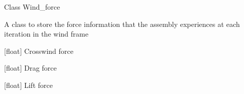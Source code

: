 \documentclass[letterpaper,10pt,english]{sphinxmanual}
\begin{document}
\begin{fulllineitems}
\label{\detokenize{modules:assembly.Wind_force}}
\pysigstartsignatures
{}
\pysigstopsignatures
\sphinxAtStartPar
Class Wind\_force

\sphinxAtStartPar
A class to store the force information that the assembly experiences at each iteration in the wind frame

\begin{fulllineitems}
\label{\detokenize{modules:assembly.Wind_force.crosswind}}
\pysigstartsignatures
{}
\pysigstopsignatures
\sphinxAtStartPar
{[}float{]} Crosswind force

\end{fulllineitems}


\begin{fulllineitems}
\label{\detokenize{modules:assembly.Wind_force.drag}}
\pysigstartsignatures
{}
\pysigstopsignatures
\sphinxAtStartPar
{[}float{]} Drag force

\end{fulllineitems}


\begin{fulllineitems}
\label{\detokenize{modules:assembly.Wind_force.lift}}
\pysigstartsignatures
{}
\pysigstopsignatures
\sphinxAtStartPar
{[}float{]} Lift force

\end{fulllineitems}


\end{fulllineitems}

\end{document}
